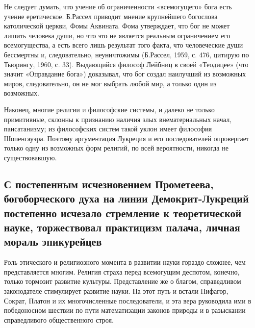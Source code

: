 Не  следует   думать,  что  учение  об   ограниченности  «всемогущего»
бога  есть учение  еретическое. Б.Рассел  приводит мнение  крупнейшего
богослова католической церкви, Фомы Аквината. Фома утверждает, что бог
не  может  лишить человека  души,  но  что  это не  является  реальным
ограничением  его  всемогущества, а  есть  всего  лишь результат  того
факта, что человеческие души бессмертны и, следовательно, неуничтожимы
(Б.Рассел, 1959, с. 476, цитирую по Тьюрингу, 1960, с. 33). Выдающийся
философ  Лейбниц в  своей  «Теодицее» (что  значит «Оправдание  бога»)
доказывал, что бог создал наилучший из возможных миров, следовательно,
он не мог выбрать любой мир, а только один из возможных.

Наконец,  многие религии  и философские  системы, и  далеко не  только
примитивные, склонны  к признанию наличия злых  внематериальных начал,
пансатанизму;  из  философских  систем  такой  уклон  имеет  философия
Шопенгауэра.  Поэтому  аргументация   Лукреция  и  его  последователей
опровергает   только  одну   из  возможных   форм  религий,   по  всей
вероятности, никогда не существовавшую.

\subsection{С  постепенным  исчезновением  Прометеева,  богоборческого
духа  на  линии  Демокрит-Лукреций постепенно  исчезало  стремление  к
теоретической  науке, торжествовал  практицизм  палача, личная  мораль
эпикурейцев}

Роль  этического  и  религиозного  момента в  развитии  науки  гораздо
сложнее, чем  представляется многим.  Религия страха  перед всемогущим
деспотом, конечно, только тормозит развитие культуры. Представление же
о  благом, справедливом  законодателе стимулирует  развитие науки.  На
этот  путь  и  встали  Пифагор, Сократ,  Платон  и  их  многочисленные
последователи, и  эта вера  руководила ими  в победоносном  шествии по
пути  математизации  законов  природы  и  в  разыскании  справедливого
общественного строя.

